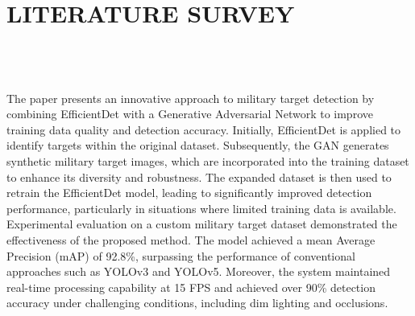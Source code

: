 \chapter{LITERATURE SURVEY}\label{ch:literature}

\begingroup
\setlength{\parindent}{0pt}
\setlength{\parskip}{8pt}
\renewcommand{\\}{\par}

\section[\LitTitleBase]{\LitTitleBase~\textbf{\cite{base_paper}} \label{sec:base_paper}}
The paper presents an innovative approach to military target detection by combining EfficientDet with a Generative Adversarial Network to improve training data quality and detection accuracy. Initially, EfficientDet is applied to identify targets within the original dataset. Subsequently, the GAN generates synthetic military target images, which are incorporated into the training dataset to enhance its diversity and robustness. The expanded dataset is then used to retrain the EfficientDet model, leading to significantly improved detection performance, particularly in situations where limited training data is available. Experimental evaluation on a custom military target dataset demonstrated the effectiveness of the proposed method. The model achieved a mean Average Precision (mAP) of 92.8\%, surpassing the performance of conventional approaches such as YOLOv3 and YOLOv5. Moreover, the system maintained real-time processing capability at 15 FPS and achieved over 90\% detection accuracy under challenging conditions, including dim lighting and occlusions.\label{end:base_paper}

